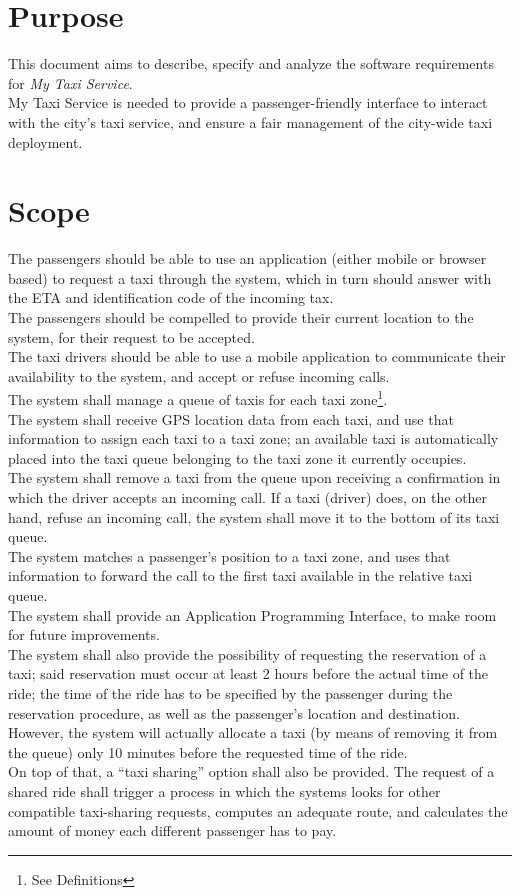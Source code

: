 \section{Purpose}
This document aims to describe, specify and analyze the software requirements for \textit{My Taxi Service}. \\
My Taxi Service is needed to provide a passenger-friendly interface to interact with the city's taxi service, and ensure
a fair management of the city-wide taxi deployment.


\section{Scope}
The passengers should be able to use an application (either mobile or browser based) to request a taxi through the system,
which in turn should answer with the ETA and identification code of the incoming tax. \\
The passengers should be compelled to provide their current location to the system, for their request to be accepted. \\
The taxi drivers should be able to use a mobile application to communicate their availability to the system, and accept
 or refuse incoming calls. \\
The system shall manage a queue of taxis for each taxi zone\footnote{See Definitions}. \\
The system shall receive GPS location data from each taxi, and use that information to assign each taxi to a 
taxi zone; an available taxi is automatically placed into the taxi queue belonging to the taxi zone it currently occupies. \\
The system shall remove a taxi from the queue upon receiving a confirmation in which the driver accepts an incoming call.
 If a taxi (driver) does, on the other hand, refuse an incoming call, the system
shall move it to the bottom of its taxi queue. \\
The system matches a passenger's position to a taxi zone, and uses that information to forward the call to the first taxi
available in the relative taxi queue. \\
The system shall provide an Application Programming Interface, to make room for future improvements. \\
The system shall also provide the possibility of requesting the reservation of a taxi; said reservation must occur at least
2 hours before the actual time of the ride; the time of the ride has to be specified by the passenger during the
reservation procedure, as well as the passenger's location and destination. \\
However, the system will actually allocate a taxi (by means of removing it from the queue) only 10 minutes before the
requested time of the ride. \\
On top of that, a ``taxi sharing'' option shall also be provided. The request of a shared ride shall trigger a process
in which the systems looks for other compatible taxi-sharing requests, computes an adequate route, and calculates
the amount of money each different passenger has to pay.

